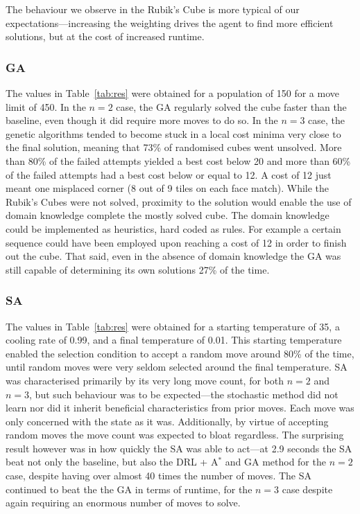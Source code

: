 \documentclass[UKenglish]{libraries/svproc}
\begin{document}
The behaviour we observe in the Rubik's Cube is more typical of our expectations---increasing the weighting drives the agent to find more efficient solutions, but at the cost of increased runtime.

\subsubsection{GA}
The values in Table~\ref{tab:res} were obtained for a population of 150 for a move limit of 450.
In the $n=2$ case, the GA regularly solved the cube faster than the baseline, even though it did require more moves to do so. In the $n=3$ case, the genetic algorithms tended to become stuck in a local cost minima very close to the final solution, meaning that 73\% of randomised cubes went unsolved. More than 80\% of the failed attempts yielded a best cost below 20 and more than 60\% of the failed attempts had a best cost below or equal to 12. A cost of 12 just meant one misplaced corner (8 out of 9 tiles on each face match).
While the Rubik's Cubes were not solved, proximity to the solution would enable the use of domain knowledge complete the mostly solved cube. The domain knowledge could be implemented as heuristics, hard coded as rules. For example a certain sequence could have been employed upon reaching a cost of 12 in order to finish out the cube. That said, even in the absence of domain knowledge the GA was still capable of determining its own solutions 27\% of the time.

\subsubsection{SA}
The values in Table~\ref{tab:res} were obtained for a starting temperature of 35, a cooling rate of 0.99, and a final temperature of 0.01. This starting temperature enabled the selection condition to accept a random move around 80\% of the time, until random moves were very seldom selected around the final temperature.
SA was characterised primarily by its very long move count, for both $n=2$ and $n=3$, but such behaviour was to be expected---the stochastic method did not learn nor did it inherit beneficial characteristics from prior moves. Each move was only concerned with the state as it was. Additionally, by virtue of accepting random moves the move count was expected to bloat regardless. The surprising result however was in how quickly the SA was able to act---at 2.9 seconds the SA beat not only the baseline, but also the DRL + A$^{\ast}$ and GA method for the $n=2$ case, despite having over almost 40 times the number of moves. The SA continued to beat the the GA in terms of runtime, for the $n=3$ case despite again requiring an enormous number of moves to solve.
\end{document}
